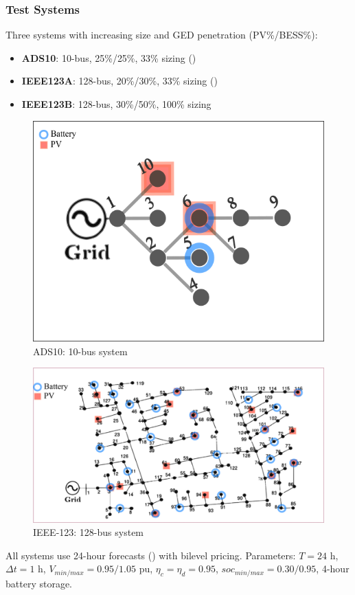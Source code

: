 \subsubsection{Test Systems}

Three systems with increasing size and GED penetration (PV\%/BESS\%):
\begin{itemize}
    \item \textbf{ADS10}: 10-bus, 25\%/25\%, 33\% sizing ()
    \item \textbf{IEEE123A}: 128-bus, 20\%/30\%, 33\% sizing ()
    \item \textbf{IEEE123B}: 128-bus, 30\%/50\%, 100\% sizing
\end{itemize}

\begin{figure}[h]
    \centering
    \includegraphics[width=0.55\linewidth]{figures/ads10-pv25-batt25.png}
    \caption{ADS10: 10-bus system}
    \label{fig:mpopf-ads10}
\end{figure}

\begin{figure}[h]
    \centering
    \includegraphics[width=0.8\linewidth]{figures/ieee123-pv20-batt30.png}
    \caption{IEEE-123: 128-bus system}
    \label{fig:mpopf-ieee123}
\end{figure}

All systems use 24-hour forecasts () with bilevel pricing. Parameters: $T=24$ h, $\Delta t=1$ h, $V_{min/max}=0.95/1.05$ pu, $\eta_c=\eta_d=0.95$, $soc_{min/max}=0.30/0.95$, 4-hour battery storage.

